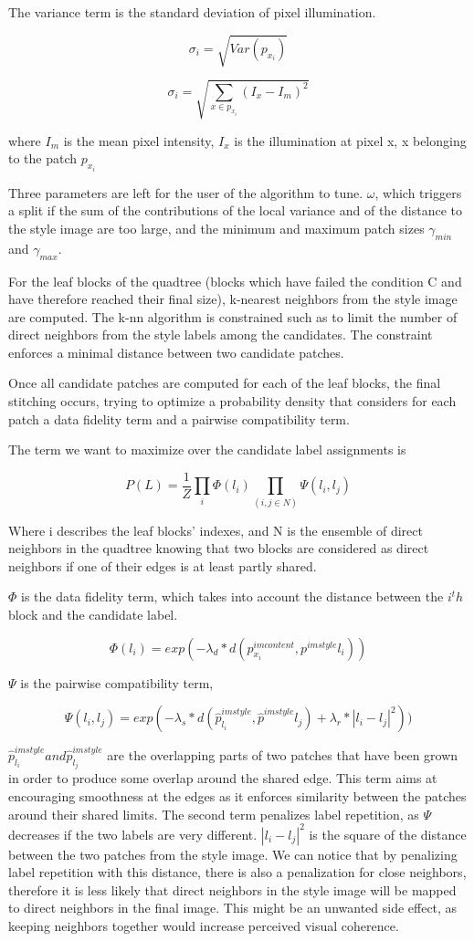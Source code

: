 \documentclass[a4paper]{article}
\begin{document}
The variance term is the standard deviation of pixel illumination.

\[\sigma_i = \sqrt{Var(p_{x_i})}\]

\[\sigma_i  = \sqrt{\sum_{x \in p_{x_i}}(I_{x} - I_m)^2}\]

where $I_m$ is the mean pixel intensity, $I_x$ is the illumination at pixel x, x belonging to the patch $p_{x_i}$

Three parameters are left for the user of the algorithm to tune. ${\omega}$, which triggers a split if the sum of the contributions of the local variance and of the distance to the style image are too large, and the minimum and maximum patch sizes $\gamma_{min}$ and $\gamma_{max}$.

For the leaf blocks of the quadtree (blocks which have failed the condition C and have therefore reached their final size), k-nearest neighbors from the style image are computed. The k-nn algorithm is constrained such as to limit the number of direct neighbors from the style labels among the candidates. The constraint enforces a minimal distance between two candidate patches.

Once all candidate patches are computed for each of the leaf blocks, the final stitching occurs, trying to optimize a probability density that considers for each patch a data fidelity term and a pairwise compatibility term.

The term we want to maximize over the candidate label assignments is 

\[P(L)=\frac{1}{Z} \prod_{i}{\Phi(l_i)}\prod_{(i,j \in N)}{\Psi(l_i, l_j)}\]

Where i describes the leaf blocks’ indexes, and N is the ensemble of direct neighbors in the quadtree knowing that two blocks are considered as direct neighbors if one of their edges is at least partly shared.

$\Phi$ is the data fidelity term, which takes into account the distance between the $i^th$ block and the candidate label.



\[\Phi(l_i) = exp(-\lambda_d*d(p^{imcontent}_{x_i}, p^{imstyle}{l_i} ))\]

$\Psi$ is the pairwise compatibility term, 

\[\Psi(l_i, l_j) = exp(-\lambda_s*d(\hat{p}^{imstyle}_{l_i}, \hat{p}^{imstyle}{l_j} ) + \lambda_r *|l_i-l_j|^2))\]

$\hat{p}^{imstyle}_{l_i} and \hat{p}^{imstyle}_{l_j}$ are the overlapping parts of two patches that have been grown in order to produce some overlap around the shared edge. This term aims at encouraging smoothness at the edges as it enforces similarity between the patches around their shared limits. The second term penalizes label repetition, as $\Psi$ decreases if the two labels are very different.
$|l_i - l_j|^2$ is the square of the distance between the two patches from the style image. We can notice that by penalizing label repetition with this distance, there is also a penalization for close neighbors, therefore it is less likely that direct neighbors in the style image will be mapped to direct neighbors in the final image. This might be an unwanted side effect, as keeping neighbors together would increase perceived visual coherence.
\end{document}
